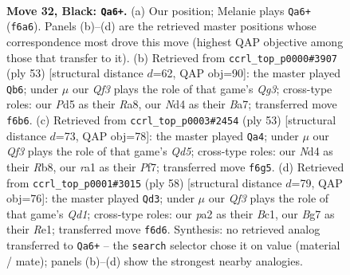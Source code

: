 \documentclass[11pt]{article}
\begin{document}
\clearpage

\begin{figure}[p]\centering
\begin{subfigure}{0.46\textwidth}\centering
\resizebox{\linewidth}{!}{%
\newchessgame
\chessboard[
  setfen={r5k1/1p3pb1/5qp1/p2pB3/3n3p/7P/P4PP1/RN1nQK2 b - - 1 32},
  showmover=false,
  pgfstyle=straightmove, color=movearrow, markmove={f6-a6}
]}
\caption{}
\end{subfigure}\hfill
\begin{subfigure}{0.46\textwidth}\centering
\resizebox{\linewidth}{!}{%
\newchessgame
\chessboard[
  setfen={r5k1/bp3pp1/p5q1/2p4B/2Pn3Q/7P/PB4P1/4R1K1 b - - 1 27},
  showmover=false,
  pgfstyle=straightmove, color=movearrow, markmove={g6-b6}
]}
\caption{}
\end{subfigure}
\\[4pt]
\begin{subfigure}{0.46\textwidth}\centering
\resizebox{\linewidth}{!}{%
\newchessgame
\chessboard[
  setfen={1r4k1/5pp1/p5b1/7p/3q2nP/2B2BP1/P3QP2/2R3K1 b - - 3 27},
  showmover=false,
  pgfstyle=straightmove, color=movearrow, markmove={d4-a4}
]}
\caption{}
\end{subfigure}\hfill
\begin{subfigure}{0.46\textwidth}\centering
\resizebox{\linewidth}{!}{%
\newchessgame
\chessboard[
  setfen={2r3k1/3q3p/pn3bp1/3p2N1/1P6/1P5P/P1p2PP1/2BQR1K1 w - - 0 30},
  showmover=false,
  pgfstyle=straightmove, color=movearrow, markmove={d1-d3}
]}
\caption{}
\end{subfigure}
\caption{\textbf{Move 32, Black: \texttt{Qa6+}.} (a) Our position; Melanie plays \texttt{Qa6+} (\texttt{f6a6}). Panels (b)--(d) are the retrieved master positions whose correspondence most drove this move (highest QAP objective among those that transfer to it). (b) Retrieved from \texttt{ccrl\_top\_p0000\#3907} (ply 53) [structural distance $d$=62, QAP obj=90]: the master played \texttt{Qb6}; under $\mu$ our \emph{Qf3} plays the role of that game's \emph{Qg3}; cross-type roles: our \emph{P}d5 as their \emph{R}a8, our \emph{N}d4 as their \emph{B}a7; transferred move \texttt{f6b6}. (c) Retrieved from \texttt{ccrl\_top\_p0003\#2454} (ply 53) [structural distance $d$=73, QAP obj=78]: the master played \texttt{Qa4}; under $\mu$ our \emph{Qf3} plays the role of that game's \emph{Qd5}; cross-type roles: our \emph{N}d4 as their \emph{R}b8, our \emph{r}a1 as their \emph{P}f7; transferred move \texttt{f6g5}. (d) Retrieved from \texttt{ccrl\_top\_p0001\#3015} (ply 58) [structural distance $d$=79, QAP obj=76]: the master played \texttt{Qd3}; under $\mu$ our \emph{Qf3} plays the role of that game's \emph{Qd1}; cross-type roles: our \emph{p}a2 as their \emph{B}c1, our \emph{B}g7 as their \emph{R}e1; transferred move \texttt{f6d6}. Synthesis: no retrieved analog transferred to \texttt{Qa6+} -- the \texttt{search} selector chose it on value (material / mate); panels (b)--(d) show the strongest nearby analogies.}
\label{fig:thought-m63}
\end{figure}
\end{document}
